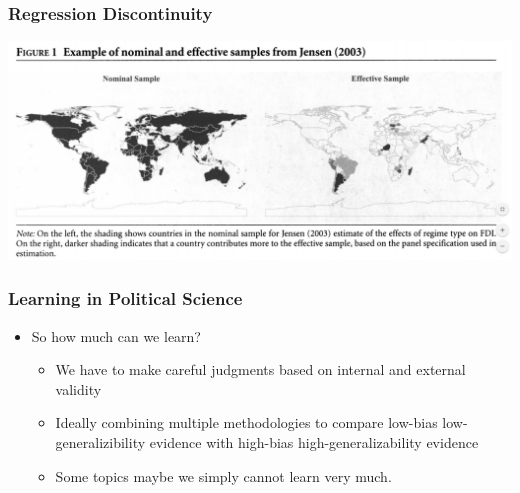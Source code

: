 \documentclass[xcolor=x11names,compress]{beamer}\usepackage[]{graphicx}\usepackage[]{xcolor}
\renewcommand{\(}{\begin{columns}}
\renewcommand{\)}{\end{columns}}
\newcommand{\<}[1]{\begin{column}{#1}}
\renewcommand{\>}{\end{column}}
\begin{document}
\begin{frame}
\frametitle{Regression Discontinuity}
\includegraphics[width=\textwidth]{Effective_Sample.png}
\end{frame}


\begin{frame}
\frametitle{Learning in Political Science}
\begin{itemize}
\item So how much can we learn?
\pause
\begin{itemize}
\item We have to make careful judgments based on internal and external validity
\pause
\item Ideally combining multiple methodologies to compare low-bias low-generalizibility evidence with high-bias high-generalizability evidence
\pause
\item Some topics maybe we simply cannot learn very much.
\end{itemize}
\end{itemize}
\end{frame} 
\end{document}
